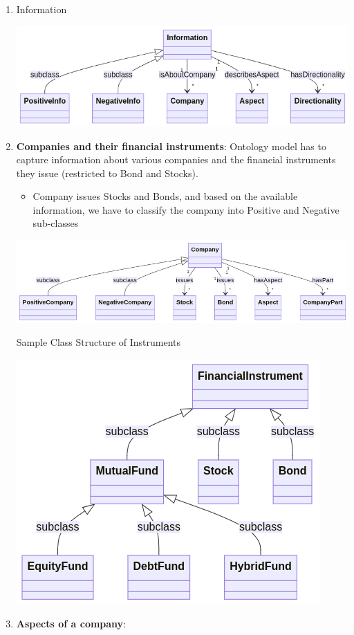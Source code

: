 \documentclass[
]{article}
\begin{document}
\begin{enumerate}
\def\labelenumi{\arabic{enumi}.}
\item
  Information

  \includegraphics[width=7.46875in,height=\textheight]{17293660394468.png}
\item
  \textbf{Companies and their financial instruments}: Ontology model has
  to capture information about various companies and the financial
  instruments they issue (restricted to Bond and Stocks).

  \begin{itemize}
  \item
    Company issues Stocks and Bonds, and based on the available
    information, we have to classify the company into Positive and
    Negative sub-classes
  \end{itemize}

  \includegraphics[width=8.82292in,height=\textheight]{17293660394659.png}

  Sample Class Structure of Instruments

  \includegraphics[width=4.5625in,height=\textheight]{172936603947810.png}
\item
  \textbf{Aspects of a company}:


\end{enumerate}
\end{document}
